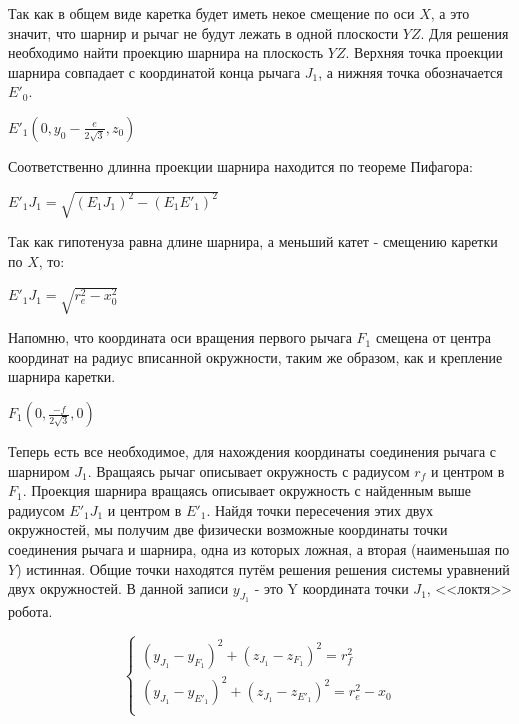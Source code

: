 Так как в общем виде каретка будет иметь некое смещение по оси $X$, а это значит, что шарнир и рычаг не будут лежать в одной плоскости $YZ$. Для решения необходимо найти проекцию шарнира на плоскость $YZ$. Верхняя точка проекции шарнира совпадает с координатой конца рычага $J_{1}$, а нижняя точка обозначается $E'_{0}$. 

\begin{center}
$E'_{1} (0,y_{0}-\frac{e}{2\sqrt{3}},z_{0})$
\end{center}

Соответственно длинна проекции шарнира находится по теореме Пифагора:

\begin{center}
$E'_{1}J_{1} = \sqrt{(E_{1}J_{1})^{2} -(E_{1}E'_{1})^{2}}  $
\end{center}

Так как гипотенуза равна длине шарнира, а меньший катет - смещению каретки по $X$, то: 

\begin{center}
    $E'_{1}J_{1} = \sqrt{r^{2}_{e} - x^{2}_{0} }  $
\end{center}

Напомню, что координата оси вращения первого рычага $F_{1}$  смещена от центра координат на радиус вписанной окружности, таким же образом, как и крепление шарнира каретки.

\begin{center}
    $F_{1}(0,\frac{-f}{2\sqrt{3}},0)$
\end{center}

Теперь есть все необходимое, для нахождения координаты соединения рычага с шарниром $J_{1}$. Вращаясь рычаг описывает окружность с радиусом $r_{f}$ и центром в  $F_{1}$. Проекция шарнира вращаясь описывает окружность с найденным выше радиусом $E'_{1}J_{1}$ и центром в $E'_{1}$. Найдя точки пересечения этих двух окружностей, мы получим две физически возможные координаты точки соединения рычага и шарнира, одна из которых ложная, а вторая (наименьшая по $Y$) истинная. Общие точки находятся путём решения решения системы уравнений двух окружностей. В данной записи $y_{J_{1}}$ - это Y координата точки $J_{1}$, <<локтя>> робота.

\begin{equation*}
    \begin{cases}
        (y_{J_{1}} -y_{F_{1}})^{2} +(z_{J_{1}}-z_{F_{1}})^{2} = r^{2}_{f}\\
        (y_{J_{1}} -y_{E'_{1}})^{2} +(z_{J_{1}}-z_{E'_{1}})^{2} = r^{2}_{e}-x_{0}\\
    \end{cases}
\end{equation*}

